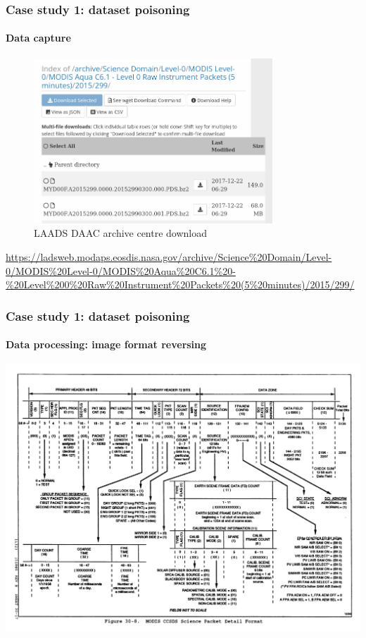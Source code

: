 \documentclass{beamer}
\begin{document}
\begin{frame}
  \frametitle{Case study 1: dataset poisoning}
  \framesubtitle{Data capture}
  \begin{figure}
    \includegraphics[width=0.8\textwidth]{images/level0.png}
    \caption{LAADS DAAC archive centre download}
    \label{fig:level0}
  \end{figure}  
  \url{https://ladsweb.modaps.eosdis.nasa.gov/archive/Science\%20Domain/Level-0/MODIS\%20Level-0/MODIS\%20Aqua\%20C6.1\%20-\%20Level\%200\%20Raw\%20Instrument\%20Packets\%20(5\%20minutes)/2015/299/}

\end{frame}

\begin{frame}
  \frametitle{Case study 1: dataset poisoning}
  \framesubtitle{Data processing: image format reversing}
  \includegraphics[width=\textwidth]{images/image_format.png}

\end{frame}
\end{document}
